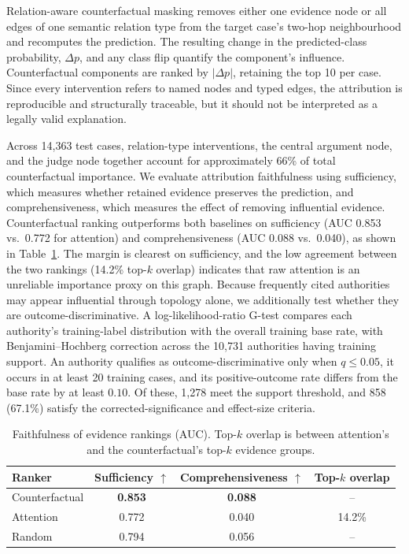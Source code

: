 \documentclass[runningheads]{llncs}
\begin{document}
Relation-aware counterfactual masking removes either one evidence node or
all edges of one semantic relation type from the target case's two-hop
neighbourhood and recomputes the prediction. The resulting change in the
predicted-class probability, $\Delta p$, and any class flip quantify the
component's influence. Counterfactual components are ranked by $|\Delta p|$, retaining the top 10 per case. Since every intervention refers to named nodes and
typed edges, the attribution is reproducible and structurally traceable,
but it should not be interpreted as a legally valid explanation.

Across 14,363 test cases, relation-type interventions, the central argument
node, and the judge node together account for approximately 66\% of total
counterfactual importance. We evaluate attribution faithfulness using
sufficiency, which measures whether retained evidence preserves the prediction,
and comprehensiveness, which measures the effect of removing influential
evidence. Counterfactual ranking outperforms both baselines on sufficiency
(AUC 0.853 vs.\ 0.772 for attention) and comprehensiveness
(AUC 0.088 vs.\ 0.040), as shown in Table~\ref{tab:faithfulness}.
The margin is clearest on sufficiency, and the low agreement between
the two rankings (14.2\% top-$k$ overlap) indicates that raw attention
is an unreliable importance proxy on this graph. Because frequently cited authorities may appear influential through topology
alone, we additionally test whether they are outcome-discriminative. A
log-likelihood-ratio G-test compares each authority's training-label
distribution with the overall training base rate, with Benjamini--Hochberg
correction across the 10{,}731 authorities having training support. An
authority qualifies as outcome-discriminative only when $q\leq0.05$, it occurs
in at least 20 training cases, and its positive-outcome rate differs from the
base rate by at least $0.10$. Of these, 1{,}278 meet the support threshold, and
858 (67.1\%) satisfy the corrected-significance and effect-size criteria.

\begin{table}[b]
\centering
\small
\setlength{\tabcolsep}{4pt}
\caption{Faithfulness of evidence rankings (AUC). Top-$k$ overlap is between attention's and the counterfactual's top-$k$ evidence groups.}
\label{tab:faithfulness}
\begin{tabular}{lccc}
\hline
Ranker & Sufficiency $\uparrow$ &
Comprehensiveness $\uparrow$ & Top-$k$ overlap \\
\hline
Counterfactual & \textbf{0.853} & \textbf{0.088} & -- \\
Attention      & 0.772          & 0.040          & 14.2\% \\
Random         & 0.794          & 0.056          & -- \\
\hline
\end{tabular}
\end{table}
\end{document}
